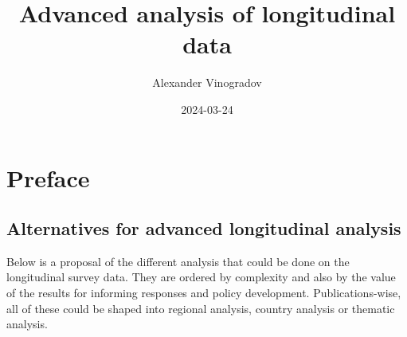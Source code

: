 \documentclass[
  letterpaper,
  DIV=11,
  numbers=noendperiod]{scrreprt}
\title{Advanced analysis of longitudinal data}
\author{Alexander Vinogradov}
\date{2024-03-24}
\renewcommand*\contentsname{Table of contents}
\newcommand\contentsname{Table of contents}
\begin{document}
\maketitle

\renewcommand*\contentsname{Table of contents}
{
\hypersetup{linkcolor=}
\setcounter{tocdepth}{2}
\tableofcontents
}

\chapter*{Preface}\label{preface}


\section*{Alternatives for advanced longitudinal
analysis}\label{alternatives-for-advanced-longitudinal-analysis}


Below is a proposal of the different analysis that could be done on the
longitudinal survey data. They are ordered by complexity and also by the
value of the results for informing responses and policy development.
Publications-wise, all of these could be shaped into regional analysis,
country analysis or thematic analysis.
\end{document}
